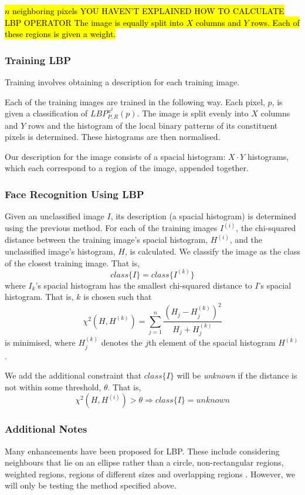 \documentclass{article}
\begin{document}
\hl{$n$ neighboring pixels 
YOU HAVEN'T EXPLAINED HOW TO CALCULATE LBP OPERATOR
The image is equally split into $X$ columns and $Y$ rows. Each of these regions is given a weight.}
\subsubsection{Training LBP}
Training involves obtaining a description for each training image.

Each of the training images are trained in the following way. Each pixel, $p$, is given a classification of $LBP_{P,R}^{u^2}(p)$. The image is split evenly into $X$ columns and $Y$ rows and the histogram of the local binary patterns of its constituent pixels is determined. These histograms are then normalised.

Our description for the image consists of a spacial histogram: $X\cdot Y$ histograms, which each correspond to a region of the image, appended together.

\subsubsection{Face Recognition Using LBP}
Given an unclassified image $I$, its description (a spacial histogram) is determined using the previous method. For each of the training images $I^{(i)}$, the chi-squared distance between the training image's spacial histogram, $H^{(i)}$, and the unclassified image's histogram, $H$, is calculated.
We classify the image as the class of the closest training image. That is,
\begin{equation}
	class\{I\} = class\{I^{(k)}\}
\end{equation}
where $I_k$'s spacial histogram has the smallest chi-squared distance to $I$'s spacial histogram. That is, $k$ is chosen such that
\begin{equation}
	\chi^2(H, H^{(k)}) = \sum_{j=1}^{n}\frac{(H_j - H^{(k)}_j)^2}{H_j + H^{(k)}_j}
\end{equation}
is minimised, where $H^{(k)}_j$ denotes the $j$th element of the spacial histogram $H^{(k)}$.

We add the additional constraint that $class\{I\}$ will be \textit{unknown} if the distance is not within some threshold, $\theta$. That is,
\begin{equation}
	\chi^2(H, H^{(i)}) > \theta \Rightarrow class\{I\} = unknown
\end{equation}

\subsubsection{Additional Notes}
Many enhancements have been proposed for LBP. These include considering neighbours that lie on an ellipse rather than a circle, non-rectangular regions, weighted regions, regions of different sizes and overlapping regions \cite{belhumeur1997eigenfaces}. However, we will only be testing the method specified above.
\end{document}
